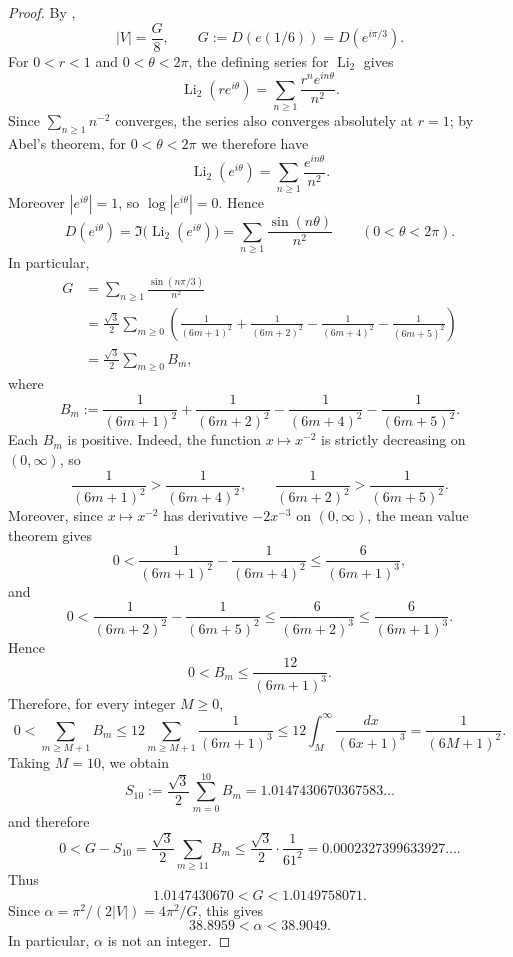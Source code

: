 \documentclass[reqno]{amsart}
\theoremstyle{definition}
\theoremstyle{plain}
\theoremstyle{remark}
\numberwithin{equation}{section}
\begin{document}
\begin{proof}

By \cite[Theorem~1.2(2) and Remark~(1)]{FMRS},
\[
  |V|=\frac{G}{8},
  \qquad
  G:=D(e(1/6))=D(e^{i\pi/3}).
\]
For $0<r<1$ and $0<\theta<2\pi$, the defining series for $\operatorname{Li}_2$ gives
\[
  \operatorname{Li}_2(re^{i\theta})=\sum_{n\ge 1}\frac{r^n e^{in\theta}}{n^2}.
\]
Since $\sum_{n\ge 1}n^{-2}$ converges, the series also converges absolutely at $r=1$; by Abel's theorem, for $0<\theta<2\pi$ we therefore have
\[
  \operatorname{Li}_2(e^{i\theta})=\sum_{n\ge 1}\frac{e^{in\theta}}{n^2}.
\]
Moreover $|e^{i\theta}|=1$, so $\log|e^{i\theta}|=0$. Hence
\[
  D(e^{i\theta})=\Im\bigl(\operatorname{Li}_2(e^{i\theta})\bigr)
  =\sum_{n\ge 1}\frac{\sin(n\theta)}{n^2}
  \qquad (0<\theta<2\pi).
\]
In particular,
\begin{align*}
  G&=\sum_{n\ge 1}\frac{\sin(n\pi/3)}{n^2} \\
   &=\frac{\sqrt 3}{2}\sum_{m\ge 0}
    \left(
      \frac{1}{(6m+1)^2}+\frac{1}{(6m+2)^2}-\frac{1}{(6m+4)^2}-\frac{1}{(6m+5)^2}
    \right) \\
   &= \frac{\sqrt 3}{2}\sum_{m\ge 0} B_m,
\end{align*}
where
\[
  B_m:=\frac{1}{(6m+1)^2}+\frac{1}{(6m+2)^2}-\frac{1}{(6m+4)^2}-\frac{1}{(6m+5)^2}.
\]
Each $B_m$ is positive. Indeed, the function $x\mapsto x^{-2}$ is strictly decreasing on $(0,\infty)$, so
\[
  \frac{1}{(6m+1)^2}>\frac{1}{(6m+4)^2},
  \qquad
  \frac{1}{(6m+2)^2}>\frac{1}{(6m+5)^2}.
\]
Moreover, since $x\mapsto x^{-2}$ has derivative $-2x^{-3}$ on $(0,\infty)$, the mean value theorem gives
\[
  0<
  \frac{1}{(6m+1)^2}-\frac{1}{(6m+4)^2}
  \le \frac{6}{(6m+1)^3},
\]
and
\[
  0<
  \frac{1}{(6m+2)^2}-\frac{1}{(6m+5)^2}
  \le \frac{6}{(6m+2)^3}
  \le \frac{6}{(6m+1)^3}.
\]
Hence
\[
  0<B_m\le \frac{12}{(6m+1)^3}.
\]
Therefore, for every integer $M\ge 0$,
\[
  0<\sum_{m\ge M+1}B_m
   \le 12\sum_{m\ge M+1}\frac{1}{(6m+1)^3}
   \le 12\int_M^{\infty}\frac{dx}{(6x+1)^3}
   =\frac{1}{(6M+1)^2}.
\]
Taking $M=10$, we obtain
\[
  S_{10}:=\frac{\sqrt 3}{2}\sum_{m=0}^{10}B_m =1.0147430670367583\ldots
\]
and therefore
\[
  0<G-S_{10}
   =\frac{\sqrt 3}{2}\sum_{m\ge 11}B_m
   \le \frac{\sqrt 3}{2}\cdot \frac{1}{61^2}
   =0.0002327399633927\ldots.
\]
Thus
\[
  1.0147430670< G <1.0149758071.
\]
Since $\alpha=\pi^2/(2|V|)=4\pi^2/G$, this gives
\[
  38.8959<\alpha<38.9049.
\]
In particular, $\alpha$ is not an integer.
\end{proof}
\end{document}
